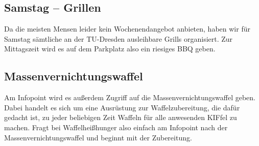 \subsection*{Samstag -- Grillen}
Da die meisten Mensen leider kein Wochenendangebot anbieten, haben wir für Samstag sämtliche an der TU-Dresden ausleihbare Grills organisiert.
Zur Mittagszeit wird es auf dem Parkplatz also ein riesiges BBQ geben.


\subsection*{Massenvernichtungswaffel}
Am Infopoint wird es außerdem Zugriff auf die Massenvernichtungswaffel geben.
Dabei handelt es sich um eine Ausrüstung zur Waffelzubereitung, die dafür gedacht ist, zu jeder beliebigen Zeit Waffeln für alle anwesenden KIFfel zu machen.
Fragt bei Waffelheißhunger also einfach am Infopoint nach der Massenvernichtungswaffel und beginnt mit der Zubereitung.
